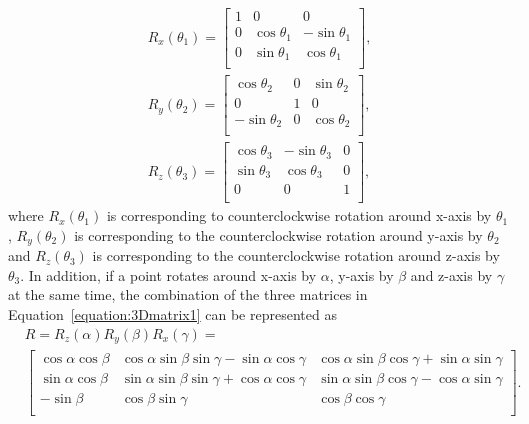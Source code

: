 \begin{equation}
\label{equation:3Dmatrix1}
\begin{aligned}
R_{x}(\theta_{1})=\begin{bmatrix}
1&          0&          0\\
0&\cos\theta_{1} & -\sin\theta_{1}\\
0&\sin\theta_{1} & \cos\theta_{1}\\
\end{bmatrix},
\\R_{y}(\theta_{2})=\begin{bmatrix}
  \cos\theta_{2}&          0&\sin\theta_{2}\\
           0&          1& 0\\
-\sin\theta_{2} &          0&\cos\theta_{2}\\
\end{bmatrix},
\\R_{z}(\theta_{3})=\begin{bmatrix}
\cos\theta_{3}&-\sin\theta_{3}&0\\
\sin\theta_{3}& \cos\theta_{3}&0\\
         0&          0&1\\
\end{bmatrix},
\end{aligned}
\end{equation}
where $R_{x}(\theta_{1})$ is corresponding to counterclockwise rotation around x-axis by $\theta_{1}$, $R_{y}(\theta_{2})$ is corresponding to the counterclockwise rotation around y-axis by $\theta_{2}$ and $R_{z}(\theta_{3})$ is corresponding to the counterclockwise rotation around z-axis by $\theta_{3}$. In addition, if a point rotates around x-axis by $\alpha$, y-axis by $\beta$ and z-axis by $\gamma$ at the same time, the combination of the three matrices in Equation~\ref{equation:3Dmatrix1} can be represented as
\begin{equation}
\label{equation:3Dmatrix2}
\begin{aligned}
&R=R_{z}(\alpha)R_{y}(\beta)R_{x}(\gamma)=\\
&\begin{bmatrix}
\cos\alpha\cos\beta&\cos\alpha\sin\beta\sin\gamma-\sin\alpha\cos\gamma&\cos\alpha\sin\beta\cos\gamma+\sin\alpha\sin\gamma\\
\sin\alpha\cos\beta&\sin\alpha\sin\beta\sin\gamma+\cos\alpha\cos\gamma&\sin\alpha\sin\beta\cos\gamma-\cos\alpha\sin\gamma\\
         -\sin\beta&                               \cos\beta\sin\gamma&\cos\beta\cos\gamma\\
\end{bmatrix}.
\end{aligned}
\end{equation}
